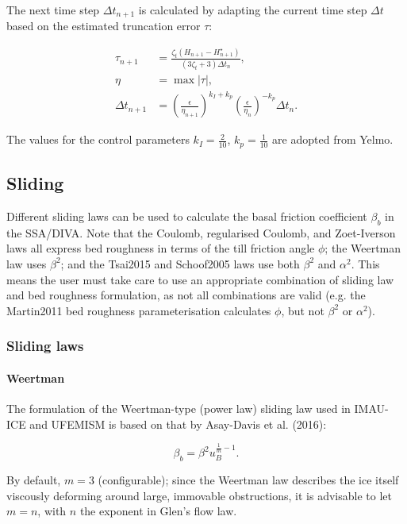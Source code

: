 \documentclass{article}
\begin{document}
The next time step $\Delta t_{n+1}$ is calculated by adapting the current time step $\Delta t$ based on the estimated truncation error $\tau$:

\begin{align} \label{eq:timestep_06}
\tau_{n+1} &= \frac{\zeta_t \left( H_{n+1} - H_{n+1}^{\star} \right) }{\left( 3 \zeta_t + 3 \right) \Delta t_n}, \\
\eta &= \max \left| \tau \right|, \\
\Delta t_{n+1} &= {\left( \frac{\epsilon}{\eta_{n+1}} \right)}^{k_I + k_p}
{\left( \frac{\epsilon}{\eta_n} \right) }^{-k_p} \Delta t_n.
\end{align}

The values for the control parameters $k_I = \frac{2}{10}$, $k_p = \frac{1}{10}$ are adopted from Yelmo.

\newpage
\subsection{Sliding}

Different sliding laws can be used to calculate the basal friction coefficient $\beta_b$ in the SSA/DIVA. Note that the Coulomb, regularised Coulomb, and Zoet-Iverson laws all express bed roughness in terms of the till friction angle $\phi$; the Weertman law uses $\beta^2$; and the Tsai2015 and Schoof2005 laws use both $\beta^2$ and $\alpha^2$. This means the user must take care to use an appropriate combination of sliding law and bed roughness formulation, as not all combinations are valid (e.g. the Martin2011 bed roughness parameterisation calculates $\phi$, but not $\beta^2$ or $\alpha^2$).

\subsubsection{Sliding laws}

\paragraph{Weertman}
The formulation of the Weertman-type (power law) sliding law used in IMAU-ICE and UFEMISM is based on that by Asay-Davis et al. (2016):

\begin{equation} \label{eq:slid_Weertman}
\beta_b = \beta^2 u_B^{\frac{1}{m}-1}.
\end{equation}

By default, $m=3$ (configurable); since the Weertman law describes the ice itself viscously deforming around large, immovable obstructions, it is advisable to let $m=n$, with $n$ the exponent in Glen's flow law.
\end{document}
